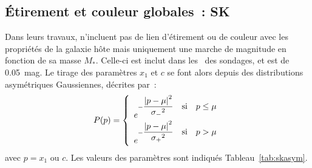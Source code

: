 \documentclass[../main/main.tex]{subfiles}
\begin{document}
\subsection{Étirement et couleur globales~: SK}\label{ssec:sk}

Dans leurs travaux,  n'incluent pas de lien d'étirement
ou de couleur avec les propriétés de la galaxie hôte mais uniquement une marche
de magnitude en fonction de sa masse $M_*$. Celle-ci est inclut dans les
\wgtmap\ des sondages, et est de \SI{0.05}{mag}. Le tirage des paramètres $x_1$
et $c$ se font alors depuis des distributions asymétriques Gaussiennes, décrites
par~:
\begin{equation}\label{eq:skasym}
    P(p) = \left\{
        \begin{array}{l}
            e^{-\displaystyle\frac{\abs{p-\mu}^2}{\sigma_-{}^2}
                \quad\text{si}\quad p\leq\mu} \\
            e^{-\displaystyle\frac{\abs{p-\mu}^2}{\sigma_+{}^2}
                \quad\text{si}\quad p>\mu} \\
        \end{array}
        \right.
\end{equation}
avec $p = x_1$ ou $c$. Les valeurs des paramètres sont indiqués
Tableau~\ref{tab:skasym}.
\end{document}
